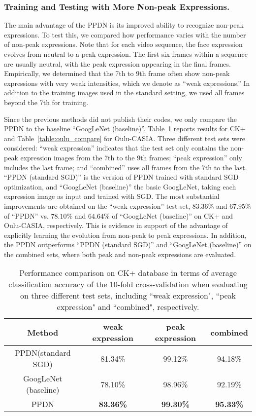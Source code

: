 \documentclass[runningheads]{llncs}
\begin{document}
\subsubsection{Training and Testing with More Non-peak Expressions.} 
The main advantage of the PPDN is its improved ability to
recognize non-peak expressions. To test this,
we compared how performance varies with the number of non-peak expressions. 
Note that for each video sequence, the face expression evolves from neutral 
to a peak expression. The first six frames within a sequence are usually
neutral, with the peak expression appearing in the final frames. 
Empirically, we determined that the 7th to 9th frame often show 
non-peak expressions with very weak intensities, which we
denote as ``weak expressions.'' In addition to the training images used
in the standard setting,  we used all frames beyond the 7th for training. 

Since the previous methods did not publish their codes, we only compare 
the PPDN to the baseline ``GoogLeNet (baseline)''.
Table~\ref{table:ck_compare} reports results for CK+ and 
Table~\ref{table:oulu_compare} for Oulu-CASIA. Three different test sets
were considered: ``weak expression'' indicates that the test set only 
contains the non-peak expression images from the 7th to the 9th frames;
``peak expression'' only includes the last frame; and ``combined'' 
uses all frames from the 7th to the last. ``PPDN (standard SGD)'' is the 
version of PPDN trained with standard SGD optimization, and 
``GoogLeNet (baseline)'' the basic GoogLeNet, taking each expression image 
as input and trained with SGD. The most substantial improvements 
are obtained on the ``weak expression'' test set, $83.36\%$ and
$67.95\%$ of ``PPDN'' vs. $78.10\%$ and $64.64\%$ of ``GoogLeNet (baseline)''
on CK+ and Oulu-CASIA, respectively. This is evidence in support
of the advantage of explicitly learning the evolution from non-peak 
to peak expressions. In addition, the PPDN outperforms ``PPDN (standard SGD)''
and ``GoogLeNet (baseline)'' on the combined sets, where both peak and 
non-peak expressions are evaluated. 

\begin{table}[!tp]\setlength{\tabcolsep}{0.5pt}
	\begin{center}
		\caption{Performance comparison on CK+ database in terms of average classification accuracy of the 10-fold cross-validation when evaluating on three different test sets, including ``weak expression", ``peak expression" and ``combined", respectively.}
		\label{table:ck_compare}
		\begin{tabular}{c|c|c|c}
			\hline\noalign{\smallskip}
			Method & weak expression & peak expression & combined\\
			\hline
			PPDN(standard SGD) & 81.34\% & 99.12\% & 94.18\%\\
			GoogLeNet (baseline)   & 78.10\% & 98.96\% & 92.19\%\\
			\hline
			PPDN & \textbf{83.36\%} & \textbf{99.30\%} & \textbf{95.33\%}\\
			\hline
		\end{tabular}
	\end{center}
\end{table}
\end{document}
